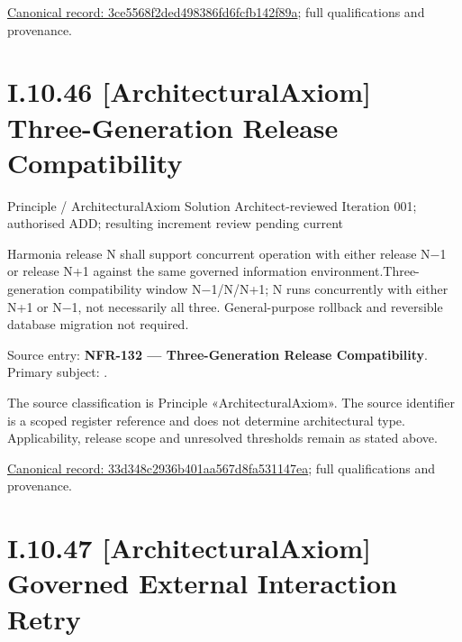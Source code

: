 {\footnotesize \href{../../../../continuum/motivation/principle/architectural-axiom/3ce5568f2ded498386fd6fcfb142f89a.md}{Canonical record: 3ce5568f2ded498386fd6fcfb142f89a}; full qualifications and provenance.}\par
\section*{I.10.46 [ArchitecturalAxiom] Three-Generation Release Compatibility}
\label{navigation:I.10.46}

\label{element:33d348c2936b401aa567d8fa531147ea}
{\small Principle / ArchitecturalAxiom  Solution Architect-reviewed Iteration 001; authorised ADD; resulting increment review pending  current}\par

Harmonia release N shall support concurrent operation with either release N−1 or release N+1 against the same governed information environment.Three-generation compatibility window N−1/N/N+1; N runs concurrently with either N+1 or N−1, not necessarily all three. General-purpose rollback and reversible database migration not required.



Source entry: \textbf{NFR-132 — Three-Generation Release Compatibility}. Primary subject: \texttt{}.



The source classification is Principle «ArchitecturalAxiom». The source identifier is a scoped register reference and does not determine architectural type. Applicability, release scope and unresolved thresholds remain as stated above.


{\footnotesize \href{../../../../continuum/motivation/principle/architectural-axiom/33d348c2936b401aa567d8fa531147ea.md}{Canonical record: 33d348c2936b401aa567d8fa531147ea}; full qualifications and provenance.}\par
\section*{I.10.47 [ArchitecturalAxiom] Governed External Interaction Retry}
\label{navigation:I.10.47}

